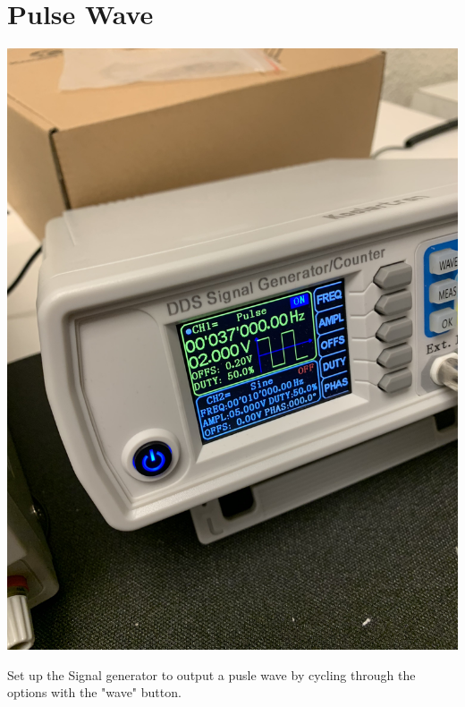 \documentclass[]{article}
\begin{document}
\section{Pulse Wave}
	\begin{center}
		\includegraphics[scale=.05]{pulse_func.jpg}\\
	\end{center}
	Set up the Signal generator to output a pusle wave by cycling through the options with the "wave" button.\\
\end{document}
